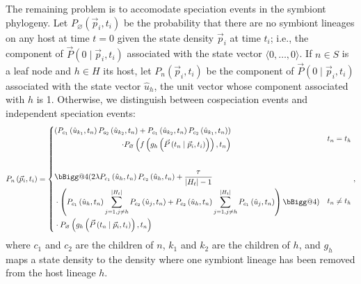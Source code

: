 \documentclass{article}
\makeatletter
\newcommand{\vast}{\bBigg@{4}}
\makeatother
\begin{document}
            The remaining problem is to accomodate speciation events in the
            symbiont phylogeny. Let $P_\varnothing\left(\vec{p}_i, t_i\right)$
            be the probability that there are no symbiont lineages on any host
            at time $t = 0$ given the state density $\vec{p}_i$ at time $t_i$;
            i.e., the component of $\vec{P}\left(0\mid\vec{p}_i, t_i\right)$
            associated with the state vector $\langle0,\dots,0\rangle$.  If $n
            \in S$ is a leaf node and $h \in H$ its host, let
            $P_n\left(\vec{p}_i, t_i\right)$ be the component of
            $\vec{P}\left(0\mid\vec{p}_i, t_i\right)$ associated with the state
            vector $\hat{u}_h$, the unit vector whose component associated with
            $h$ is 1. Otherwise, we distinguish between cospeciation events and
            independent speciation events:
            \begin{equation}
                P_n\left(\vec{p}_i, t_i\right) =
                \begin{cases}
                    \begin{aligned}
                        \left(P_{c_1}\left(\hat{u}_{k_1}, t_n\right)
                        P_{c_2}\left(\hat{u}_{k_2}, t_n\right) +
                        P_{c_1}\left(\hat{u}_{k_2}, t_n\right)
                        P_{c_2}\left(\hat{u}_{k_1}, t_n\right)\right) \\
                        \cdot P_\varnothing\left(f\left(g_h\left(\vec{P}\left(t_n\mid
                        \vec{p}_i, t_i\right)\right)\right), t_n\right)
                    \end{aligned} & t_n = t_h \\[8ex]
                    \begin{aligned}
                        & \vast( 2\lambda P_{c_1}\left(\hat{u}_h,
                        t_n\right) P_{c_2}\left(\hat{u}_h, t_n\right) +
                        \frac{\tau}{\lvert{H_t}\rvert-1} \\
                        &\cdot\left(P_{c_1}\left(\hat{u}_h, t_n\right)\sum_{j=1,j\neq
                        h}^{\lvert{H_t}\rvert}{P_{c_2}\left(\hat{u}_j,
                        t_n\right)} + P_{c_2}\left(\hat{u}_h, t_n\right)
                        \sum_{j=1,j\neq h}^{\lvert{H_t}\rvert}
                        {P_{c_1}\left(\hat{u}_j,t_n\right)}\right)\vast) \\
                        & \cdot P_\varnothing\left(g_h\left(\vec{P}\left(t_n\mid\vec{p}_i,
                        t_i\right)\right), t_n\right)
                    \end{aligned}
                    & t_n \neq t_h
                \end{cases},
            \end{equation}
            where $c_1$ and $c_2$ are the children of $n$, $k_1$ and $k_2$
            are the children of $h$, and $g_h$ maps a state density to the
            density where one symbiont lineage has been removed from the host
            lineage $h$.
\end{document}
